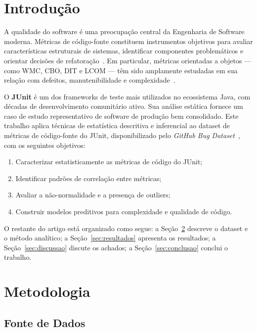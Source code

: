 \documentclass[12pt]{article}
\begin{document}
\section{Introdução}
\label{sec:intro}

A qualidade do software é uma preocupação central da Engenharia de
Software moderna. Métricas de código-fonte constituem instrumentos
objetivos para avaliar características estruturais de sistemas,
identificar componentes problemáticos e orientar decisões de
refatoração~\cite{chidamber1994}. Em particular, métricas orientadas
a objetos — como WMC, CBO, DIT e LCOM — têm sido amplamente
estudadas em sua relação com defeitos, manutenibilidade e
complexidade~\cite{briand1999}.

O \textbf{JUnit} é um dos frameworks de teste mais utilizados no
ecossistema Java, com décadas de desenvolvimento comunitário ativo.
Sua análise estática fornece um caso de estudo representativo de
software de produção bem consolidado. Este trabalho aplica técnicas
de estatística descritiva e inferencial ao dataset de métricas de
código-fonte do JUnit, disponibilizado pelo \textit{GitHub Bug
Dataset}~\cite{Ferenc2020}, com os seguintes objetivos:

\begin{enumerate}
  \item Caracterizar estatisticamente as métricas de código do JUnit;
  \item Identificar padrões de correlação entre métricas;
  \item Avaliar a não-normalidade e a presença de outliers;
  \item Construir modelos preditivos para complexidade e qualidade de código.
\end{enumerate}

O restante do artigo está organizado como segue: a Seção~\ref{sec:metodologia}
descreve o dataset e o método analítico; a Seção~\ref{sec:resultados}
apresenta os resultados; a Seção~\ref{sec:discussao} discute os
achados; a Seção~\ref{sec:conclusao} conclui o trabalho.

\section{Metodologia}
\label{sec:metodologia}

\subsection{Fonte de Dados}
\end{document}
